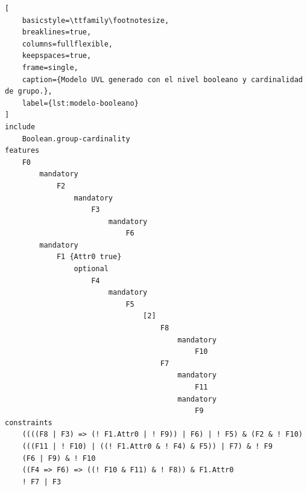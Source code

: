 \begin{lstlisting}[
    basicstyle=\ttfamily\footnotesize,
    breaklines=true,
    columns=fullflexible,
    keepspaces=true,
    frame=single,
    caption={Modelo UVL generado con el nivel booleano y cardinalidad de grupo.},
    label={lst:modelo-booleano}
]
include
    Boolean.group-cardinality
features
    F0
        mandatory
            F2
                mandatory
                    F3
                        mandatory
                            F6
        mandatory
            F1 {Attr0 true}
                optional
                    F4
                        mandatory
                            F5
                                [2]
                                    F8
                                        mandatory
                                            F10
                                    F7
                                        mandatory
                                            F11
                                        mandatory
                                            F9
constraints
    ((((F8 | F3) => (! F1.Attr0 | ! F9)) | F6) | ! F5) & (F2 & ! F10)
    (((F11 | ! F10) | ((! F1.Attr0 & ! F4) & F5)) | F7) & ! F9
    (F6 | F9) & ! F10
    ((F4 => F6) => ((! F10 & F11) & ! F8)) & F1.Attr0
    ! F7 | F3
\end{lstlisting}

